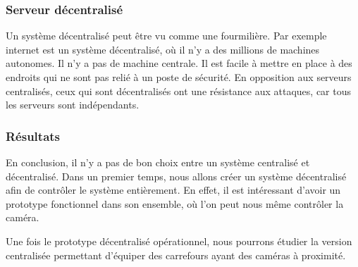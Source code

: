 \subsubsection{Serveur décentralisé}
\label{sec:centralise_decentralise}
Un système décentralisé peut être vu comme une fourmilière. Par exemple internet est un système décentralisé, où il n'y a des millions de machines autonomes. Il n'y a pas de machine centrale.
Il est facile à mettre en place à des endroits qui ne sont pas relié à un poste de sécurité.
En opposition aux serveurs centralisés, ceux qui sont décentralisés ont une résistance aux attaques, car tous les serveurs sont indépendants.

\subsubsection{Résultats}
\label{sec:centralise_resultat}
En conclusion, il n'y a pas de bon choix entre un système centralisé et décentralisé.
Dans un premier temps, nous allons créer un système décentralisé afin de contrôler le système entièrement. En effet, il est intéressant
d'avoir un prototype fonctionnel dans son ensemble, où l'on peut nous même contrôler la caméra.

Une fois le prototype décentralisé opérationnel, nous pourrons étudier la version centralisée permettant d'équiper des carrefours ayant des caméras à proximité.